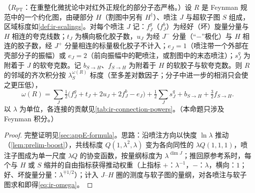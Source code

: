 \begin{proposition}\label{prop:ir-power-counting}
（$R_{\mathrm{PT}}$：在重整化微扰论中对红外正规化的部分子态严格。）设 $R$ 是 Feynman 规范中的一个约化图，由硬部分 $H$（割图中另有 $H^\dagger$）、喷注 $J$ 与超软子图 $S$ 组成，区域标度如\cref{def:ir-scalings}。对每个喷注 $J$ 记：$f^g_J$（$f^b_J$）为经好（坏）旋量分量与 $H$ 相连的夸克线数；$t_J$ 为横向极化胶子数，$u_J$ 为经 $J^-$ 分量（“$-$”极化）与 $H$ 相连的胶子数，经 $J^+$ 分量相连的标量极化胶子不计入；$e_J=1$（喷注带一个外部在壳部分子的振幅）或 $e_J=2$（前向振幅中的靶喷注，或割图中的末态喷注）；$s^q_J$ 为附着于 $J$ 的软夸克数。记 $b_{S\to H}$、$f_{S\to H}$ 为附着于 $H$ 的软胶子与软夸克数。则 $R$ 的邻域的齐次积分按 $\lambda_S^{\omega(R)}$ 标度（至多差对数因子；分子中进一步的相消只会使之更压低），
\begin{equation}\label{eq:ir-omega}
\omega(R)=\sum_J\tfrac12\big(f^g_J+t_J+2u_J+2f^b_J-e_J\big)+\tfrac12\sum_Js^q_J+b_{S\to H}+\tfrac32f_{S\to H} .
\end{equation}
以 $\lambda$ 为单位，各连接的贡献见\cref{tab:ir-connection-powers}。（本命题只涉及 Feynman 积分。）
\end{proposition}
\begin{proof}
完整证明见\cref{sec:appE-formula}。思路：沿喷注方向以快度 $\ln\lambda$ 推动（\cref{lem:prelim-boost}），共线标度 $Q(1,\lambda^2,\lambda)$ 变为各向同性的 $\lambda Q(1,1,1)$，喷注子图成为单一尺度 $\lambda Q$ 的协变函数，按量纲标度为 $\lambda^{\dim J}$；推回原参考系时，每个与 $H$ 或 $S$ 缩并的自由指标获得推动权重（上指标 $+$：$\lambda^{-1}$，$-$：$\lambda$，横向：$1$；好、坏旋量分量：$\lambda^{\mp1/2}$）；计入 $J$--$H$ 圈的测度与软子图的量纲，对各喷注与软子图求和即得\cref{eq:ir-omega}。
\end{proof}

